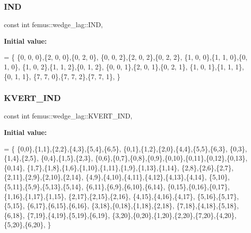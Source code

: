 \subsubsection{\texorpdfstring{I\+ND}{IND}}
{\footnotesize\ttfamily const int femus\+::wedge\+\_\+lag\+::\+I\+ND\hspace{0.3cm}{\ttfamily [static]}, {\ttfamily [protected]}}

{\bfseries Initial value\+:}
\begin{DoxyCode}
= \{
    \{0, 0, 0\},\{2, 0, 0\},\{0, 2, 0\},
    \{0, 0, 2\},\{2, 0, 2\},\{0, 2, 2\},
    \{1, 0, 0\},\{1, 1, 0\},\{0, 1, 0\},
    \{1, 0, 2\},\{1, 1, 2\},\{0, 1, 2\},
    \{0, 0, 1\},\{2, 0, 1\},\{0, 2, 1\},
    \{1, 0, 1\},\{1, 1, 1\},\{0, 1, 1\},
    \{7, 7, 0\},\{7, 7, 2\},\{7, 7, 1\},
  \}
\end{DoxyCode}
\mbox{\label{classfemus_1_1wedge__lag_a5addb93adf8823880876b5284adc560f}} 
\subsubsection{\texorpdfstring{K\+V\+E\+R\+T\+\_\+\+I\+ND}{KVERT\_IND}}
{\footnotesize\ttfamily const int femus\+::wedge\+\_\+lag\+::\+K\+V\+E\+R\+T\+\_\+\+I\+ND\hspace{0.3cm}{\ttfamily [static]}, {\ttfamily [protected]}}

{\bfseries Initial value\+:}
\begin{DoxyCode}
= \{ 
    \{0,0\},\{1,1\},\{2,2\},\{4,3\},\{5,4\},\{6,5\}, 
    \{0,1\},\{1,2\},\{2,0\},\{4,4\},\{5,5\},\{6,3\}, 
    \{0,3\},\{1,4\},\{2,5\}, 
    \{0,4\},\{1,5\},\{2,3\}, 
    \{0,6\},\{0,7\},\{0,8\},\{0,9\},\{0,10\},\{0,11\},\{0,12\},\{0,13\},\{0,14\}, 
    \{1,7\},\{1,8\},\{1,6\},\{1,10\},\{1,11\},\{1,9\},\{1,13\},\{1,14\}, 
    \{2,8\},\{2,6\},\{2,7\},\{2,11\},\{2,9\},\{2,10\},\{2,14\}, 
    \{4,9\},\{4,10\},\{4,11\},\{4,12\},\{4,13\},\{4,14\}, 
    \{5,10\},\{5,11\},\{5,9\},\{5,13\},\{5,14\}, 
    \{6,11\},\{6,9\},\{6,10\},\{6,14\}, 
    \{0,15\},\{0,16\},\{0,17\},
    \{1,16\},\{1,17\},\{1,15\},
    \{2,17\},\{2,15\},\{2,16\}, 
    \{4,15\},\{4,16\},\{4,17\},
    \{5,16\},\{5,17\},\{5,15\},
    \{6,17\},\{6,15\},\{6,16\}, 
    \{3,18\},\{0,18\},\{1,18\},\{2,18\},
    \{7,18\},\{4,18\},\{5,18\},\{6,18\},
    \{7,19\},\{4,19\},\{5,19\},\{6,19\}, 
    \{3,20\},\{0,20\},\{1,20\},\{2,20\},\{7,20\},\{4,20\},\{5,20\},\{6,20\}, 
  \}
\end{DoxyCode}
\mbox{\label{classfemus_1_1wedge__lag_a80c1cf4043f99ba0af70d1dd1a436730}} 
